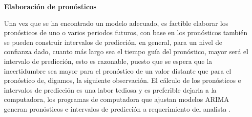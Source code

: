 \documentclass[12pt,letterpaper]{report}
\begin{document}
\textbf{Elaboración de pronósticos}

Una vez que se ha encontrado un modelo adecuado, es factible elaborar los pronósticos de uno o varios periodos futuros, con base en los
pronósticos también se pueden construir intervalos de predicción, en
general, para un nivel de confianza dado, cuanto más largo sea el tiempo guía del pronóstico, mayor será el intervalo de predicción, esto es
razonable, puesto que se espera que la incertidumbre sea mayor para
el pronóstico de un valor distante que para el pronóstico de, digamos,
la siguiente observación. El cálculo de los pronósticos e intervalos de
predicción es una labor tediosa y es preferible dejarla a la computadora,
los programas de computadora que ajustan modelos ARIMA generan
pronósticos e intervalos de predicción a requerimiento del analista \cite{Isaac}.






\nocite{*}


\end{document}
